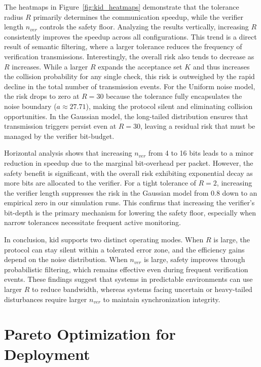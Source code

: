 The heatmaps in Figure~\ref{fig:kid_heatmaps} demonstrate that the tolerance radius $R$ primarily determines the communication speedup, while the verifier length $n_{ver}$ controls the safety floor. Analyzing the results vertically, increasing $R$ consistently improves the speedup across all configurations. This trend is a direct result of semantic filtering, where a larger tolerance reduces the frequency of verification transmissions. Interestingly, the overall risk also tends to decrease as $R$ increases. While a larger $R$ expands the acceptance set $K$ and thus increases the collision probability for any single check, this risk is outweighed by the rapid decline in the total number of transmission events. For the Uniform noise model, the risk drops to zero at $R=30$ because the tolerance fully encapsulates the noise boundary ($a \approx 27.71$), making the protocol silent and eliminating collision opportunities. In the Gaussian model, the long-tailed distribution ensures that transmission triggers persist even at $R=30$, leaving a residual risk that must be managed by the verifier bit-budget.

Horizontal analysis shows that increasing $n_{ver}$ from 4 to 16 bits leads to a minor reduction in speedup due to the marginal bit-overhead per packet. However, the safety benefit is significant, with the overall risk exhibiting exponential decay as more bits are allocated to the verifier. For a tight tolerance of $R=2$, increasing the verifier length suppresses the risk in the Gaussian model from 0.8 down to an empirical zero in our simulation runs. This confirms that increasing the verifier's bit-depth is the primary mechanism for lowering the safety floor, especially when narrow tolerances necessitate frequent active monitoring.

In conclusion, \gls{kid} supports two distinct operating modes. When $R$ is large, the protocol can stay silent within a tolerated error zone, and the efficiency gains depend on the noise distribution. When $n_{ver}$ is large, safety improves through probabilistic filtering, which remains effective even during frequent verification events. These findings suggest that systems in predictable environments can use larger $R$ to reduce bandwidth, whereas systems facing uncertain or heavy-tailed disturbances require larger $n_{ver}$ to maintain synchronization integrity.

\section{Pareto Optimization for Deployment}
\label{sec:pareto_optimization}

